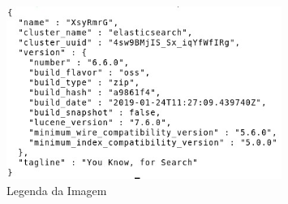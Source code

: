 \clearpage

\begin{figure}[!htb]
	\centering
	\includegraphics[width=0.8\textwidth,natwidth=610,natheight=642]{imagens/pretty.jpeg}
	\caption{Legenda da Imagem}
	\label{Label de referência para a imagem}
\end{figure}
